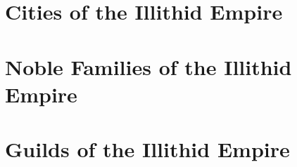 

\begin{multicols}{2}

\section{Cities of the Illithid Empire}


\section{Noble Families of the Illithid Empire}


\section{Guilds of the Illithid Empire}


\end{multicols}
